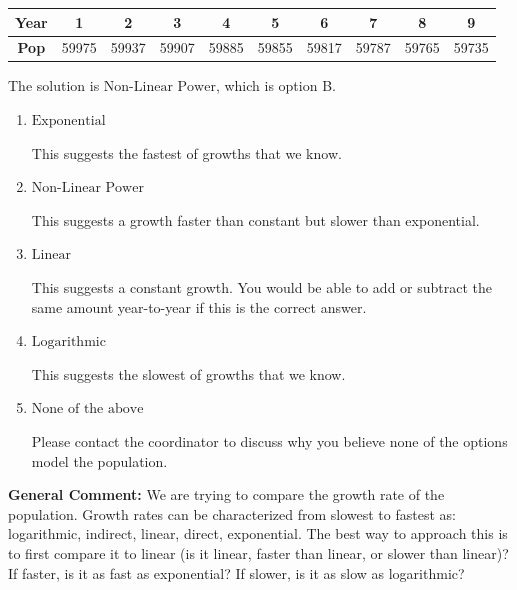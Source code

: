 \documentclass{extbook}[14pt]
\begin{document}
\begin{enumerate}
{\begin{tabular}{c|c|c|c|c|c|c|c|c|c}
\textbf{Year} &1 &2 &3 &4 &5 &6 &7 &8 &9\tabularnewline \hline
\textbf{Pop} &59975 &59937 &59907 &59885 &59855 &59817 &59787 &59765 &59735\end{tabular}The solution is \( \text{Non-Linear Power} \), which is option B.\begin{enumerate}[label=\Alph*.]
\item \( \text{Exponential} \)

This suggests the fastest of growths that we know.
\item \( \text{Non-Linear Power} \)

This suggests a growth faster than constant but slower than exponential.
\item \( \text{Linear} \)

This suggests a constant growth. You would be able to add or subtract the same amount year-to-year if this is the correct answer.
\item \( \text{Logarithmic} \)

This suggests the slowest of growths that we know.
\item \( \text{None of the above} \)

Please contact the coordinator to discuss why you believe none of the options model the population.
\end{enumerate}

\textbf{General Comment:} We are trying to compare the growth rate of the population. Growth rates can be characterized from slowest to fastest as: logarithmic, indirect, linear, direct, exponential. The best way to approach this is to first compare it to linear (is it linear, faster than linear, or slower than linear)? If faster, is it as fast as exponential? If slower, is it as slow as logarithmic?
}
\end{enumerate}
\end{document}
